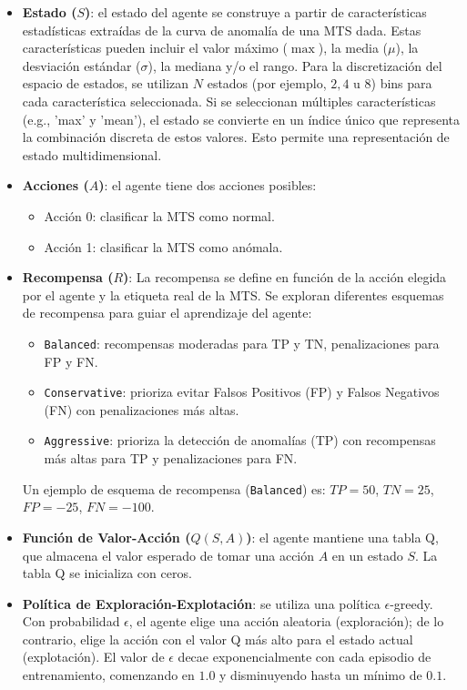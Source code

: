 \documentclass[12pt]{article}
\begin{document}
\begin{itemize}
    \item \textbf{Estado ($S$)}: el estado del agente se construye a partir de características estadísticas extraídas de la curva de anomalía de una MTS dada.
    Estas características pueden incluir el valor máximo ($\max$), la media ($\mu$), la desviación estándar ($\sigma$), la mediana y/o el rango.
    Para la discretización del espacio de estados, se utilizan $N$ estados (por ejemplo, $2, 4$ u $8$) bins para cada característica seleccionada.
    Si se seleccionan múltiples características (e.g., 'max' y 'mean'), el estado se convierte en un índice único que representa la combinación discreta de estos valores.
    Esto permite una representación de estado multidimensional.
    \item \textbf{Acciones ($A$)}: el agente tiene dos acciones posibles:
    \begin{itemize}
        \item Acción 0: clasificar la MTS como normal.
        \item Acción 1: clasificar la MTS como anómala.
    \end{itemize}
    \item \textbf{Recompensa ($R$)}: La recompensa se define en función de la acción elegida por el agente y la etiqueta real de la MTS. Se exploran diferentes esquemas de recompensa para guiar el aprendizaje del agente:
    \begin{itemize}
        \item \texttt{Balanced}: recompensas moderadas para TP y TN, penalizaciones para FP y FN.
        \item \texttt{Conservative}: prioriza evitar Falsos Positivos (FP) y Falsos Negativos (FN) con penalizaciones más altas.
        \item \texttt{Aggressive}: prioriza la detección de anomalías (TP) con recompensas más altas para TP y penalizaciones para FN.
    \end{itemize}
    Un ejemplo de esquema de recompensa (\texttt{Balanced}) es: $TP = 50$, $TN = 25$, $FP = -25$, $FN = -100$.
    \item \textbf{Función de Valor-Acción ($Q(S,A)$)}: el agente mantiene una tabla Q, que almacena el valor esperado de tomar una acción $A$ en un estado $S$. La tabla Q se inicializa con ceros.
    \item \textbf{Política de Exploración-Explotación}: se utiliza una política $\epsilon$-greedy.
    Con probabilidad $\epsilon$, el agente elige una acción aleatoria (exploración); de lo contrario, elige la acción con el valor Q más alto para el estado actual (explotación). El valor de $\epsilon$ decae exponencialmente con cada episodio de entrenamiento, comenzando en $1.0$ y disminuyendo hasta un mínimo de $0.1$.

\end{itemize}
\end{document}
